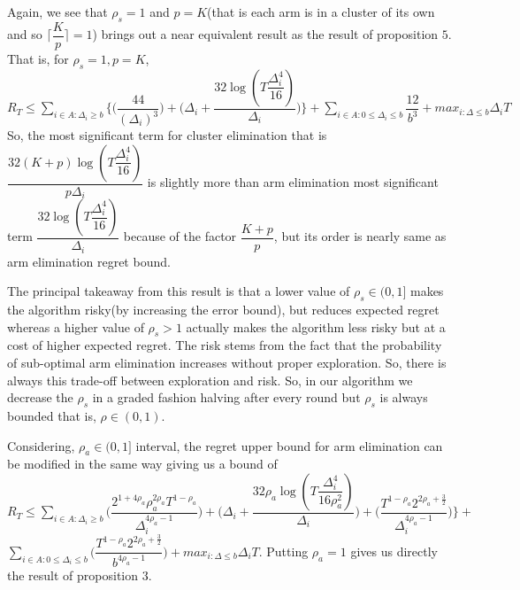 \par Again, we see that $\rho_{s}=1$ and $p=K$(that is each arm is in a cluster of its own and so $\bigg\lceil \dfrac{K}{p} \bigg\rceil=1$) brings out a near equivalent result as the result of proposition $5$. That is, for $\rho_{s}=1,p=K$,
\newline $R_{T}\leq \sum_{i\in A:\Delta_{i}\geq b}\bigg \lbrace \bigg(\dfrac{44}{(\Delta_{i})^{3}}\bigg) + \bigg(\Delta_{i}+\dfrac{32\log{(T\dfrac{\Delta_{i}^{4}}{16})}}{\Delta_{i}}\bigg)\bigg\rbrace + \sum_{i\in A:0\leq\Delta_{i}\leq b}\dfrac{12}{b^{3}} + max_{i:\Delta\leq b}\Delta_{i}T$
\newline So, the most significant term for cluster elimination that is $\dfrac{32(K+p)\log{(T\dfrac{\Delta_{i}^{4}}{16})}}{p\Delta_{i}}$ is slightly more than arm elimination most significant term $\dfrac{32\log{(T\dfrac{\Delta_{i}^{4}}{16})}}{\Delta_{i}}$ because of the factor $\dfrac{K+p}{p}$, but its order is nearly same as arm elimination regret bound.
\par The principal takeaway from this result is that a lower value of $\rho_{s}\in (0,1]$ makes the algorithm risky(by increasing the error bound), but reduces expected regret whereas a higher value of $\rho_{s} > 1$ actually makes the algorithm less risky but at a cost of higher expected regret. The risk stems from the fact that the probability of sub-optimal arm elimination increases without proper exploration. So, there is always this trade-off between exploration and risk. So, in our algorithm we decrease the $\rho_{s}$ in a graded fashion halving after every round but $\rho_{s}$ is always bounded that is, $\rho \in (0,1)$. \

\begin{remark}
Considering, $\rho_{a}\in (0,1]$ interval, the regret upper bound for arm elimination can be modified in the same way giving us a bound of
\newline
$R_{T}\leq \sum_{i\in A:\Delta_{i}\geq b}\bigg(\dfrac{2^{1+4\rho_{a}}\rho_{a}^{2\rho_{a}}T^{1-\rho_{a}}}{\Delta_{i}^{4\rho_{a}-1}}\bigg) + \bigg(\Delta_{i}+\dfrac{32\rho_{a}\log{(T\dfrac{\Delta_{i}^{4}}{16\rho_{a}^{2}})}}{\Delta_{i}}\bigg)  +  \bigg(\dfrac{T^{1-\rho_{a}}2^{2\rho_{a}+\frac{3}{2}}}{\Delta_{i}^{4\rho_{a} -1}} \bigg) \bigg \rbrace+$\newline$\sum_{i\in A:0\leq\Delta_{i}\leq b}\bigg(\dfrac{T^{1-\rho_{a}}2^{2\rho_{a}+\frac{3}{2}}}{b^{4\rho_{a} -1}} \bigg) + max_{i:\Delta\leq b}\Delta_{i}T$. 
\newline
Putting $\rho_{a}=1$ gives us directly the result of proposition $3$.
\end{remark}

